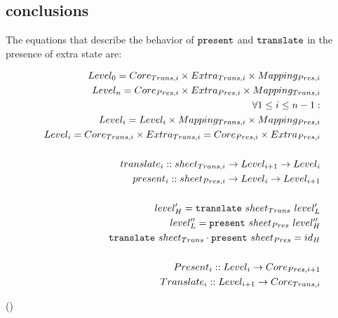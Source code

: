 



%																
\subsection{conclusions}

The equations that describe the behavior of ${\tt present}$ and ${\tt translate}$ in the presence of extra state are:

\begin{small}\begin{align*}%
Level_{0} = Core_{Trans,i} \times Extra_{Trans,i} \times Mapping_{Pres,i}\\
Level_{n} = Core_{Pres,i} \times Extra_{Pres,i} \times Mapping_{Trans,i}\\
\forall 1 \le i \le n-1:  \\
Level_{i} = Level_{i} \times Mapping_{Trans,i} \times Mapping_{Pres,i}\\
Level_{i} = Core_{Trans,i} \times Extra_{Trans,i} = Core_{Pres,i} \times Extra_{Pres,i} \\
\\
translate_{i} :: sheet_{Trans,i} \rightarrow Level_{i+1} \rightarrow Level_{i}\\
present_{i} :: sheet_{Pres,i}  \rightarrow  Level_{i} \rightarrow Level_{i+1}\\
\\
level'_{H} = {\tt translate}~sheet_{Trans}~level'_{L}\\
level''_{L} = {\tt present}~sheet_{Pres}~level''_{H}\\
{\tt translate}~sheet_{Trans}  \cdot {\tt present}~sheet_{Pres} = id_{H}\\
\\
Present_{i} :: Level_{i} \rightarrow Core_{Pres,i+1}\\
Translate_{i} :: Level_{i+1} \rightarrow Core_{Trans,i}\\
\end{align*} 
\end{small}
{\centering ()\\}

